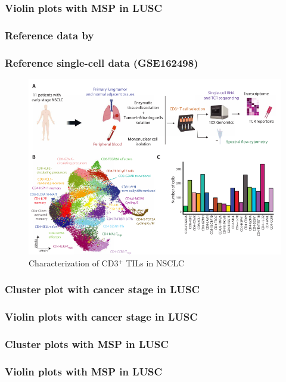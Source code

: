 \documentclass{beamer}
\begin{document}
                \begin{frame}[allowframebreaks]
                    \frametitle{Violin plots with MSP in LUSC}
                \end{frame}

            \subsubsection{Reference data by \protect{}}
                \begin{frame}
                    \frametitle{Reference single-cell data (GSE162498)}

                    \begin{figure}
                        \includegraphics[width=0.8 \linewidth]{figures/LungCancer/reference_2.png}
                        \caption{Characterization of CD3$^+$ TILs in NSCLC \cite{singlecell-02}}
                    \end{figure}
                \end{frame}

                \begin{frame}
                    \frametitle{Cluster plot with cancer stage in LUSC}
                \end{frame}

                \begin{frame}
                    \frametitle{Violin plots with cancer stage in LUSC}
                \end{frame}

                \begin{frame}
                    \frametitle{Cluster plots with MSP in LUSC}
                \end{frame}

                \begin{frame}
                    \frametitle{Violin plots with MSP in LUSC}
                \end{frame}
\end{document}
